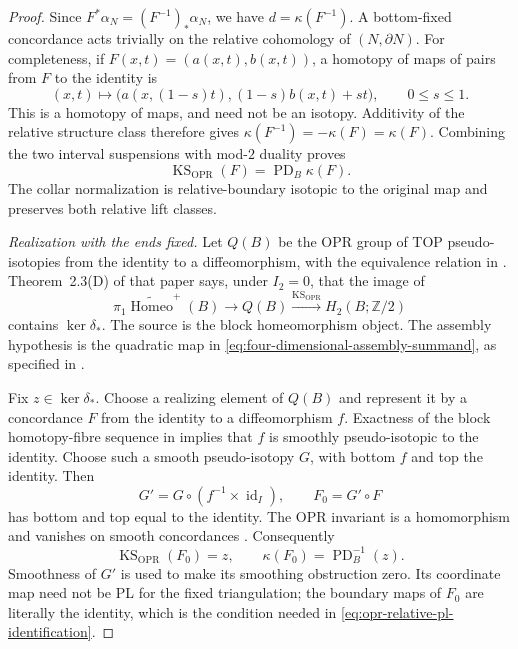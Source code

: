 \begin{proof}
Since $F^*\alpha_N=(F^{-1})_*\alpha_N$, we have
$d=\kappa(F^{-1})$. A bottom-fixed concordance acts trivially on
the relative cohomology of $(N,\partial N)$. For completeness, if
$F(x,t)=(a(x,t),b(x,t))$, a homotopy of maps of pairs from $F$ to
the identity is
\[
 (x,t)\longmapsto
 \bigl(a(x,(1-s)t),(1-s)b(x,t)+st\bigr),\qquad 0\leq s\leq1.
\]
This is a homotopy of maps, and need not be an isotopy.
Additivity of the relative structure class therefore gives
$\kappa(F^{-1})=-\kappa(F)=\kappa(F)$.
Combining the two interval suspensions with mod-$2$ duality proves
\begin{equation}\label{eq:opr-relative-pl-identification}
 \operatorname{KS}_{\mathrm{OPR}}(F)
                    =\operatorname{PD}_B\kappa(F).
\end{equation}
The collar normalization is relative-boundary isotopic to the
original map and preserves both relative lift classes.

\medskip\noindent\textit{Realization with the ends fixed.}
Let $Q(B)$ be the OPR group of TOP pseudo-isotopies from the
identity to a diffeomorphism, with the equivalence relation in
\cite[Definition~2.1, p.~5]{OrsonPowellRandalWilliams2026}.
Theorem~2.3(D) of that paper says, under $I_2=0$, that the image of
\[
 \pi_1\widetilde{\operatorname{Homeo}}^+(B)
        \longrightarrow Q(B)
        \xrightarrow{\operatorname{KS}_{\mathrm{OPR}}}
                         H_2(B;\mathbb Z/2)
\]
contains $\ker\delta_*$.
The source is the block homeomorphism object. The assembly hypothesis
is the quadratic map in
\eqref{eq:four-dimensional-assembly-summand}, as specified in
\cite[Definition~5.8 and proof, pp.~21--22]{OrsonPowellRandalWilliams2026}.

Fix $z\in\ker\delta_*$. Choose a realizing element of $Q(B)$ and
represent it by a concordance $F$ from the identity to a
diffeomorphism $f$. Exactness of the block homotopy-fibre sequence
in \cite[equation~(1), p.~6]{OrsonPowellRandalWilliams2026}
implies that $f$ is smoothly pseudo-isotopic to the identity.
Choose such a smooth pseudo-isotopy $G$, with bottom $f$ and top
the identity. Then
\[
       G'=G\circ(f^{-1}\times\operatorname{id}_I),
       \qquad F_0=G'\circ F
\]
has bottom and top equal to the identity. The OPR invariant is a
homomorphism and vanishes on smooth concordances
\cite[Lemma~3.2 and the proof of Lemma~2.2, pp.~7--9]
{OrsonPowellRandalWilliams2026}. Consequently
\begin{equation}\label{eq:both-ended-obstruction-realization}
 \operatorname{KS}_{\mathrm{OPR}}(F_0)=z,
       \qquad \kappa(F_0)=\operatorname{PD}_B^{-1}(z).
\end{equation}
Smoothness of $G'$ is used to make its smoothing obstruction
zero. Its coordinate map need not be PL for the fixed
triangulation; the boundary maps of $F_0$ are literally the
identity, which is the condition needed in
\eqref{eq:opr-relative-pl-identification}.


\end{proof}
